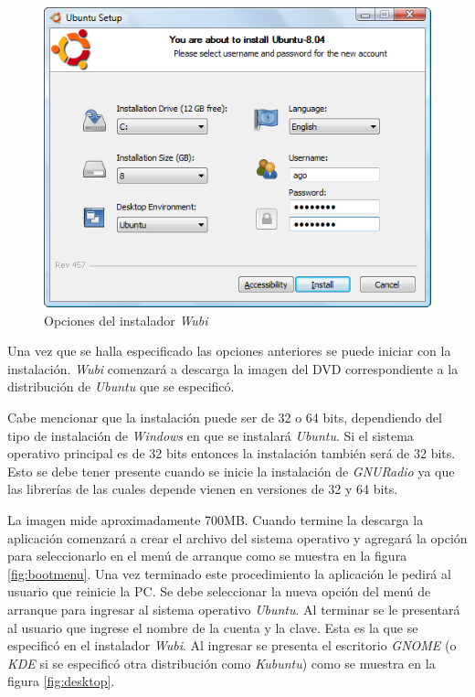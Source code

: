 \begin{figure}[hpt]
\centering
	\includegraphics[scale=0.5]{figs/wubi}
	\vspace{0.1in}
	\caption{Opciones del instalador \emph{Wubi}}
	\label{fig:wubi}
\end{figure}

Una vez que se halla especificado las opciones anteriores se puede iniciar con la instalaci\'on. \emph{Wubi} comenzar\'a a
descarga la imagen del DVD correspondiente a la distribuci\'on de \emph{Ubuntu} que se especific\'o.

Cabe mencionar que la instalaci\'on puede ser de 32 o 64 bits, dependiendo del
tipo de instalaci\'on de \emph{Windows} en que se instalar\'a \emph{Ubuntu}. Si
el sistema operativo principal es de 32 bits entonces la instalaci\'on tambi\'en
ser\'a de 32 bits. Esto se debe tener presente cuando se inicie la instalaci\'on
de \emph{GNURadio} ya que las librer\'ias de las cuales depende vienen en
versiones de 32 y 64 bits.

La imagen mide aproximadamente 700MB. Cuando termine la descarga la aplicaci\'on
comenzar\'a a crear el archivo del sistema operativo y agregar\'a la opci\'on para
seleccionarlo en el men\'u de arranque como se muestra en la figura
\ref{fig:bootmenu}. Una vez terminado este procedimiento la aplicaci\'on le
pedir\'a al usuario que reinicie la PC. Se debe seleccionar la nueva opci\'on del men\'u
de arranque para ingresar al sistema operativo \emph{Ubuntu}. Al terminar se le presentar\'a al usuario que ingrese el
nombre de la cuenta y la clave. Esta es la que se especific\'o en el instalador
\emph{Wubi}. Al ingresar se presenta el escritorio \emph{GNOME} (o \emph{KDE} si se especific\'o otra distribuci\'on como
\emph{Kubuntu}) como se muestra en la figura \ref{fig:desktop}.


